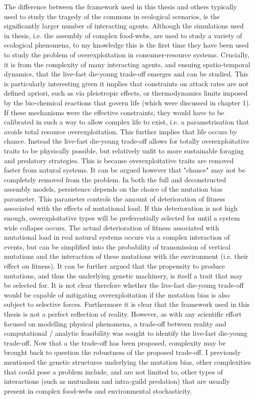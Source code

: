 \documentclass[a4paper]{report}
\begin{document}
  The difference between the framework used in this thesis and others typically used to study the tragedy of the commons in ecological scenarios, is the significantly larger number of interacting agents. Although the simulations used in thesis, i.e. the assembly of complex food-webs, are used to study a variety of ecological phenomena, to my knowledge this is the first time they have been used to study the problem of overexploitation in consumer-resource systems. Crucially, it is from the complexity of many interacting agents, and ensuing spatio-temporal dynamics, that the live-fast die-young trade-off emerges and can be studied. This is particularly interesting given it implies that constraints on attack rates are not defined apriori, such as via pleiotropic effects, or thermodynamics limits imposed by the bio-chemical reactions that govern life (which were discussed in chapter 1). If these mechanisms were the effective constraints, they would have to be calibrated in such a way to allow complex life to exist, i.e. a parametrisation that avoids total resource overexploitation. This further implies that life occurs by chance. Instead the live-fast die-young trade-off allows for totally overexploitative traits to be physically possible, but relatively unfit to more sustainable foraging and predatory strategies. This is because overexploitative traits are removed faster from natural systems. It can be argued however that "chance" may not be completely removed from the problem. In both the full and deconstructed assembly models, persistence depends on the choice of the mutation bias parameter. This parameter controls the amount of deterioration of fitness associated with the effects of mutational load. If this deterioration is not high enough, overexploitative types will be preferentially selected for until a system wide collapse occurs. The actual deterioration of fitness associated with mutational load in real natural systems occurs via a complex interaction of events, but can be simplified into the probability of transmission of vertical mutations and the interaction of these mutations with the environment (i.e. their effect on fitness). It can be further argued that the propensity to produce mutations, and thus the underlying genetic machinery, is itself a trait that may be selected for. It is not clear therefore whether the live-fast die-young trade-off would be capable of mitigating overexploitation if the mutation bias is also subject to selective forces. Furthermore it is clear that the framework used in this thesis is not a perfect reflection of reality. However, as with any scientific effort focused on modelling physical phenomena, a trade-off between reality and computational / analytic feasibility was sought to identify the live-fast die-young trade-off. Now that a the trade-off has been proposed, complexity may be brought back to question the robustness of the proposed trade-off. I previously mentioned the genetic structures underlying the mutation bias, other complexities that could pose a problem include, and are not limited to, other types of interactions (such as mutualism and intra-guild predation) that are usually present in complex food-webs and environmental stochasticity. \\
 
\end{document}
